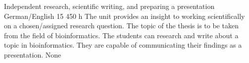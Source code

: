 {Independent research, scientific writing, and preparing a presentation}
{German/English}
{15}
{450 h}
{The unit provides an insight to working scientifically on a chosen/assigned research question. The topic of the thesis is to be taken from the field of bioinformatics.}
{The students can research and write about a topic in bioinformatics. They are capable of communicating their findings as a presentation.}
{None}
